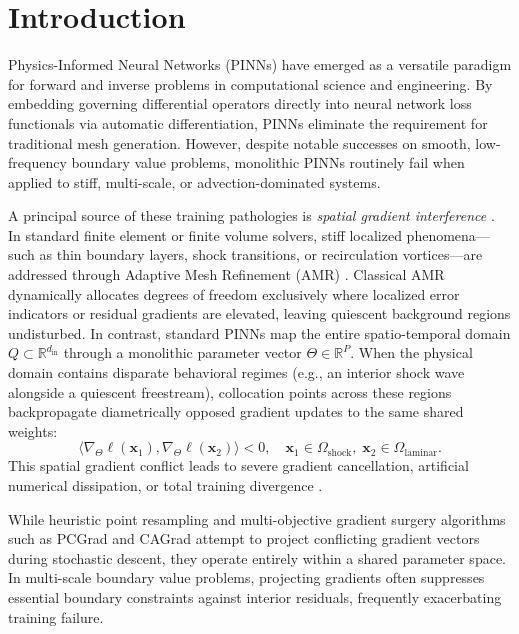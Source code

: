 \documentclass[runningheads]{llncs}
\begin{document}
\section{Introduction}
\label{sec:intro}
Physics-Informed Neural Networks (PINNs) \cite{raissi2019physics} have emerged as a versatile paradigm for forward and inverse problems in computational science and engineering. By embedding governing differential operators directly into neural network loss functionals via automatic differentiation, PINNs eliminate the requirement for traditional mesh generation. However, despite notable successes on smooth, low-frequency boundary value problems, monolithic PINNs routinely fail when applied to stiff, multi-scale, or advection-dominated systems. 

A principal source of these training pathologies is \textit{spatial gradient interference} \cite{wang2021understanding,krishnapriyan2021characterizing}. In standard finite element or finite volume solvers, stiff localized phenomena---such as thin boundary layers, shock transitions, or recirculation vortices---are addressed through Adaptive Mesh Refinement (AMR) \cite{berger1984adaptive}. Classical AMR dynamically allocates degrees of freedom exclusively where localized error indicators or residual gradients are elevated, leaving quiescent background regions undisturbed. In contrast, standard PINNs map the entire spatio-temporal domain $Q \subset \mathbb{R}^{d_{\text{in}}}$ through a monolithic parameter vector $\Theta \in \mathbb{R}^P$. When the physical domain contains disparate behavioral regimes (e.g., an interior shock wave alongside a quiescent freestream), collocation points across these regions backpropagate diametrically opposed gradient updates to the same shared weights:
\begin{equation}
\langle \nabla_\Theta \ell(\mathbf{x}_1), \nabla_\Theta \ell(\mathbf{x}_2) \rangle < 0, \quad \mathbf{x}_1 \in \Omega_{\text{shock}}, \; \mathbf{x}_2 \in \Omega_{\text{laminar}}.
\end{equation}
This spatial gradient conflict leads to severe gradient cancellation, artificial numerical dissipation, or total training divergence \cite{gangwar2026decoupling}.

While heuristic point resampling \cite{lu2021deepxde} and multi-objective gradient surgery algorithms such as PCGrad \cite{yu2020gradient} and CAGrad \cite{liu2021cagrad} attempt to project conflicting gradient vectors during stochastic descent, they operate entirely within a shared parameter space. In multi-scale boundary value problems, projecting gradients often suppresses essential boundary constraints against interior residuals, frequently exacerbating training failure.
\end{document}
